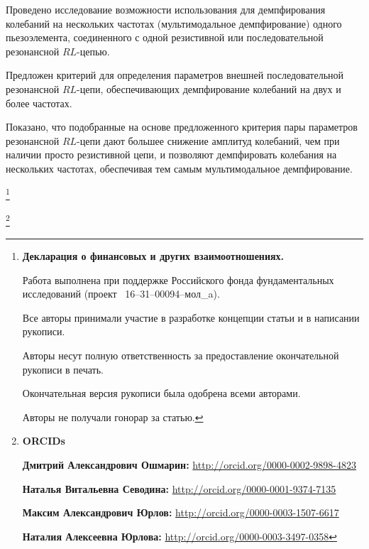 Проведено исследование возможности использования для демпфирования колебаний на нескольких частотах (мультимодальное демпфирование) одного пьезоэлемента, соединенного с одной резистивной или последовательной резонансной $RL$-цепью.



Предложен критерий для определения параметров внешней последовательной резонансной $RL$-цепи, обеспечивающих демпфирование колебаний на двух и более частотах.



Показано, что подобранные на основе предложенного критерия пары параметров резонансной $RL$-цепи дают большее снижение амплитуд колебаний, чем при наличии просто резистивной цепи, и позволяют демпфировать колебания на нескольких частотах, обеспечивая тем самым мультимодальное демпфирование.





\thanks{{\bf Декларация о финансовых и других взаимоотношениях.}

Работа выполнена при поддержке  Российского фонда фундаментальных исследований (проект \No~16--31--00094--мол\_a).

Все  авторы  принимали  участие  в  разработке  концепции  \mbox{статьи}  и  в  написании  рукописи. 

Авторы несут  полную  ответственность  за  предоставление  окончательной рукописи в печать.

Окончательная  версия рукописи была одобрена всеми авторами.

Авторы не получали гонорар за статью.

}









\thanks{{\bf ORCIDs}



{\bf  Дмитрий Александрович Ошмарин:}    \url{http://orcid.org/0000-0002-9898-4823}



{\bf   Наталья Витальевна Севодина:}   \url{http://orcid.org/0000-0001-9374-7135}



{\bf   Максим Александрович Юрлов:}    \url{http://orcid.org/0000-0003-1507-6617}



{\bf Наталия Алексеевна Юрлова:}   \url{http://orcid.org/0000-0003-3497-0358}



}





